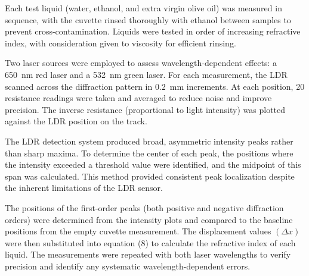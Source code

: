 Each test liquid (water, ethanol, and extra virgin olive oil) was
measured in sequence, with the cuvette rinsed thoroughly with ethanol
between samples to prevent cross-contamination.
Liquids were tested in order of increasing refractive index, with
consideration given to viscosity for efficient rinsing.

Two laser sources were employed to assess wavelength-dependent effects:
a 650~nm red laser and a 532~nm green laser.
For each measurement, the LDR scanned across the diffraction pattern in
0.2~mm increments.
At each position, 20 resistance readings were taken and averaged to
reduce noise and improve precision.
The inverse resistance (proportional to light intensity) was plotted
against the LDR position on the track.

The LDR detection system produced broad, asymmetric intensity peaks
rather than sharp maxima.
To determine the center of each peak, the positions where the intensity
exceeded a threshold value were identified, and the midpoint of this
span was calculated.
This method provided consistent peak localization despite the inherent
limitations of the LDR sensor.

The positions of the first-order peaks (both positive and negative
diffraction orders) were determined from the intensity plots and
compared to the baseline positions from the empty cuvette measurement.
The displacement values \((\Delta x)\) were then substituted into
equation (8) to calculate the refractive index of each liquid.
The measurements were repeated with both laser wavelengths to verify
precision and identify any systematic wavelength-dependent errors.

